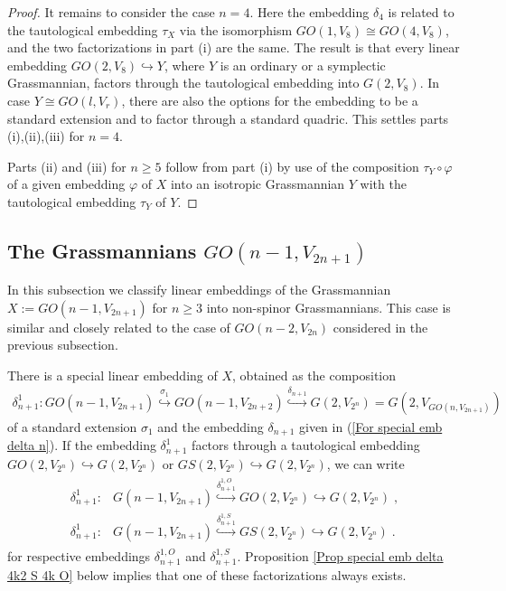 \documentclass[12pt]{amsart}
\def\hw  {\hookrightarrow}
\begin{document}
\begin{proof}
It remains to consider the case $n=4$. Here the embedding $\delta_4$ is related to the tautological embedding $\tau_X$ via the isomorphism $GO(1,V_8)\cong GO(4,V_8)$, and the two factorizations in part (i) are the same. The result is that every linear embedding $GO(2,V_8)\hookrightarrow Y$, where $Y$ is an ordinary or a symplectic Grassmannian, factors through the tautological embedding into $G(2,V_8)$. In case $Y\cong GO(l,V_r)$, there are also the options for the embedding to be a standard extension and to factor through a standard quadric. This settles parts (i),(ii),(iii) for $n=4$.

Parts (ii) and (iii) for $n\geq 5$ follow from part (i) by use of the composition $\tau_Y\circ \varphi$ of a given embedding $\varphi$ of $X$ into an isotropic Grassmannian $Y$ with the tautological embedding $\tau_Y$ of $Y$.
\end{proof}


\subsection{The Grassmannians $GO(n-1,V_{2n+1})$}\label{Sec GOcodim1odd}

In this subsection we classify linear embeddings of the Grassmannian $X:=GO(n-1,V_{2n+1})$ for $n\geq 3$ into non-spinor Grassmannians. This case is similar and closely related to the case of $GO(n-2,V_{2n})$ considered in the previous subsection.

There is a special linear embedding of $X$, obtained as the composition
\begin{gather}\label{For special emb odddelta}
\delta^1_{n+1}: GO(n-1,V_{2n+1})\stackrel{\sigma_1}{\hookrightarrow} GO(n-1,V_{2n+2}) \stackrel{\delta_{n+1}}{\hookrightarrow} G(2,V_{2^n}) = G(2,V_{GO(n,V_{2n+1})}) 
\end{gather}
of a standard extension $\sigma_1$ and the embedding $\delta_{n+1}$ given in (\ref{For special emb delta n}). If the embedding $\delta^1_{n+1}$ factors through a tautological embedding $GO(2,V_{2^n})\hw G(2,V_{2^n})$ or $GS(2,V_{2^n})\hw G(2,V_{2^n})$, we can write
\begin{gather}\label{For special emb odddelta OS}
\begin{array}{rl}
\delta^1_{n+1}:& G(n-1,V_{2n+1})\stackrel{\delta^{1,O}_{n+1}}{\hw} GO(2,V_{2^n}) \hw G(2,V_{2^n}) \;,\\
\delta^1_{n+1}:& G(n-1,V_{2n+1})\stackrel{\delta^{1,S}_{n+1}}{\hw} GS(2,V_{2^n}) \hw G(2,V_{2^n}) \;.
\end{array}
\end{gather}
for respective embeddings $\delta_{n+1}^{1,O}$ and $\delta^{1,S}_{n+1}$. Proposition \ref{Prop special emb delta 4k2 S 4k O} below implies that one of these factorizations always exists. 
\end{document}
